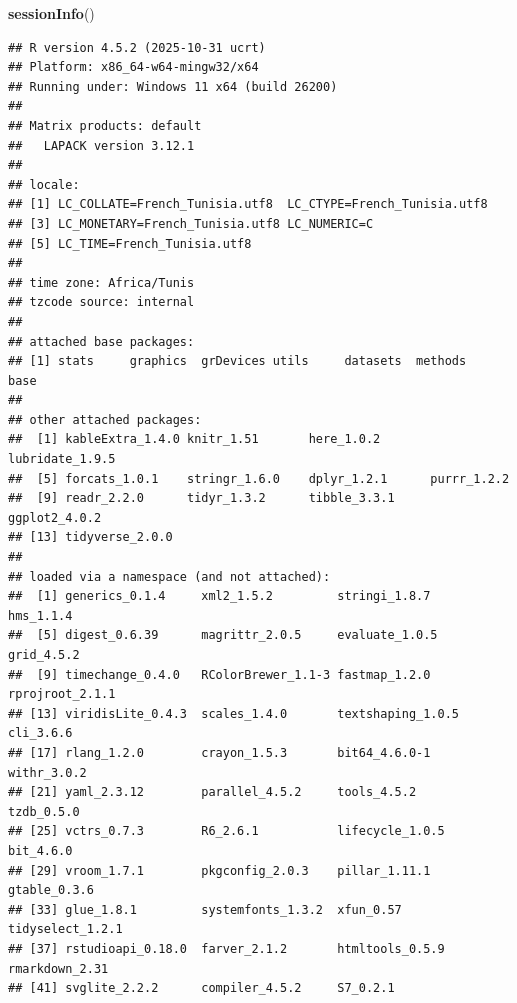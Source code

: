\documentclass[
]{article}
\newenvironment{Shaded}{\begin{snugshade}}{\end{snugshade}}
\newcommand{\FunctionTok}[1]{\textcolor[rgb]{0.13,0.29,0.53}{\textbf{#1}}}
\newcommand{\NormalTok}[1]{#1}
\begin{document}
\begin{Shaded}
\begin{Highlighting}[]
\FunctionTok{sessionInfo}\NormalTok{()}
\end{Highlighting}
\end{Shaded}

\begin{verbatim}
## R version 4.5.2 (2025-10-31 ucrt)
## Platform: x86_64-w64-mingw32/x64
## Running under: Windows 11 x64 (build 26200)
## 
## Matrix products: default
##   LAPACK version 3.12.1
## 
## locale:
## [1] LC_COLLATE=French_Tunisia.utf8  LC_CTYPE=French_Tunisia.utf8   
## [3] LC_MONETARY=French_Tunisia.utf8 LC_NUMERIC=C                   
## [5] LC_TIME=French_Tunisia.utf8    
## 
## time zone: Africa/Tunis
## tzcode source: internal
## 
## attached base packages:
## [1] stats     graphics  grDevices utils     datasets  methods   base     
## 
## other attached packages:
##  [1] kableExtra_1.4.0 knitr_1.51       here_1.0.2       lubridate_1.9.5 
##  [5] forcats_1.0.1    stringr_1.6.0    dplyr_1.2.1      purrr_1.2.2     
##  [9] readr_2.2.0      tidyr_1.3.2      tibble_3.3.1     ggplot2_4.0.2   
## [13] tidyverse_2.0.0 
## 
## loaded via a namespace (and not attached):
##  [1] generics_0.1.4     xml2_1.5.2         stringi_1.8.7      hms_1.1.4         
##  [5] digest_0.6.39      magrittr_2.0.5     evaluate_1.0.5     grid_4.5.2        
##  [9] timechange_0.4.0   RColorBrewer_1.1-3 fastmap_1.2.0      rprojroot_2.1.1   
## [13] viridisLite_0.4.3  scales_1.4.0       textshaping_1.0.5  cli_3.6.6         
## [17] rlang_1.2.0        crayon_1.5.3       bit64_4.6.0-1      withr_3.0.2       
## [21] yaml_2.3.12        parallel_4.5.2     tools_4.5.2        tzdb_0.5.0        
## [25] vctrs_0.7.3        R6_2.6.1           lifecycle_1.0.5    bit_4.6.0         
## [29] vroom_1.7.1        pkgconfig_2.0.3    pillar_1.11.1      gtable_0.3.6      
## [33] glue_1.8.1         systemfonts_1.3.2  xfun_0.57          tidyselect_1.2.1  
## [37] rstudioapi_0.18.0  farver_2.1.2       htmltools_0.5.9    rmarkdown_2.31    
## [41] svglite_2.2.2      compiler_4.5.2     S7_0.2.1
\end{verbatim}
\end{document}
